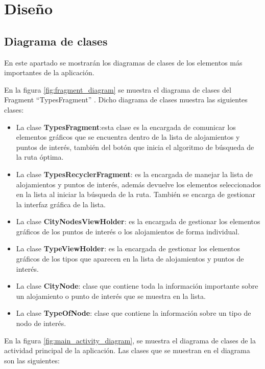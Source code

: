 \section{Diseño}
\subsection[Diagrama de clases]{Diagrama de clases}
En este apartado se mostrarán los diagramas de clases de los elementos más importantes de la aplicación.\newline

En la figura \ref{fig:fragment_diagram} se muestra el diagrama de clases del Fragment \enquote{TypesFragment} . Dicho diagrama de clases muestra las siguientes clases:
\begin{itemize}
	\item La clase \textbf{TypesFragment}:esta clase es la encargada de comunicar los elementos gráficos que se encuentra dentro de la lista de alojamientos y puntos de interés, también del botón que inicia el algoritmo de búsqueda de la ruta óptima.
	\item La clase \textbf{TypesRecyclerFragment}: es la encargada de manejar la lista de alojamientos y puntos de interés, además devuelve los elementos seleccionados en la lista al iniciar la búsqueda de la ruta. También se encarga de gestionar la interfaz gráfica de la lista.
	\item La clase \textbf{CityNodesViewHolder}: es la encargada de gestionar los elementos gráficos de los puntos de interés o los alojamientos de forma individual.
	\item La clase \textbf{TypeViewHolder}: es la encargada de gestionar los elementos gráficos de los tipos que aparecen en la lista de alojamientos y puntos de interés.
	\item La clase \textbf{CityNode}: clase que contiene toda la información importante sobre un alojamiento o punto de interés que se muestra en la lista.
	\item La clase \textbf{TypeOfNode}: clase que contiene la información sobre un tipo de nodo de interés.
\end{itemize}
\vspace{0.06in}
En la figura  \ref{fig:main_activity_diagram}, se muestra el diagrama de clases de la actividad principal de la aplicación. Las clases que se muestran en el diagrama son las siguientes:
